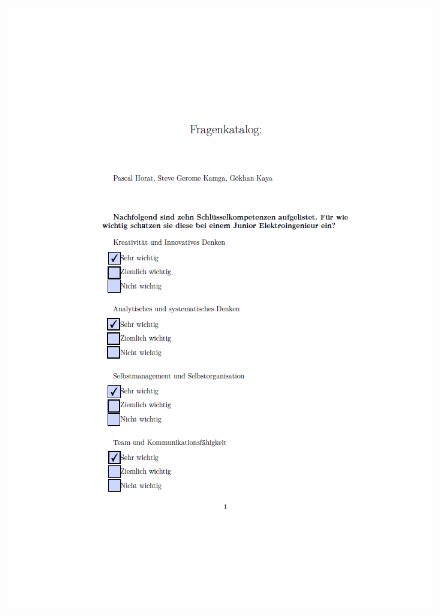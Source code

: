\begin{figure}[ht]
 	\centering
 	\includegraphics[width=1.3\textwidth]{images/Horat1.png}
 	\label{fig:hor1}
\end{figure}


